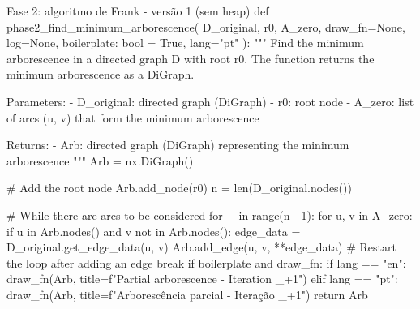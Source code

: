 \documentclass[12pt,a4paper]{article}
\begin{document}
\begin{pybox}{Fase 2: algoritmo de Frank - versão 1 (sem heap)}
def phase2_find_minimum_arborescence(
    D_original, r0, A_zero, draw_fn=None, log=None, boilerplate: bool = True, lang="pt"
):
    """
    Find the minimum arborescence in a directed graph D with root r0.
    The function returns the minimum arborescence as a DiGraph.

    Parameters:
        - D_original: directed graph (DiGraph)
        - r0: root node
        - A_zero: list of arcs (u, v) that form the minimum arborescence

    Returns:
        - Arb: directed graph (DiGraph) representing the minimum arborescence
    """
    Arb = nx.DiGraph()

    # Add the root node
    Arb.add_node(r0)
    n = len(D_original.nodes())

    # While there are arcs to be considered
    for _ in range(n - 1):
        for u, v in A_zero:
            if u in Arb.nodes() and v not in Arb.nodes():
                edge_data = D_original.get_edge_data(u, v)
                Arb.add_edge(u, v, **edge_data)
                # Restart the loop after adding an edge
                break
        if boilerplate and draw_fn:
            if lang == "en":
                draw_fn(Arb, title=f"Partial arborescence - Iteration {_+1}")
            elif lang == "pt":
                draw_fn(Arb, title=f"Arborescência parcial - Iteração {_+1}")
    return Arb
\end{pybox}
\end{document}
